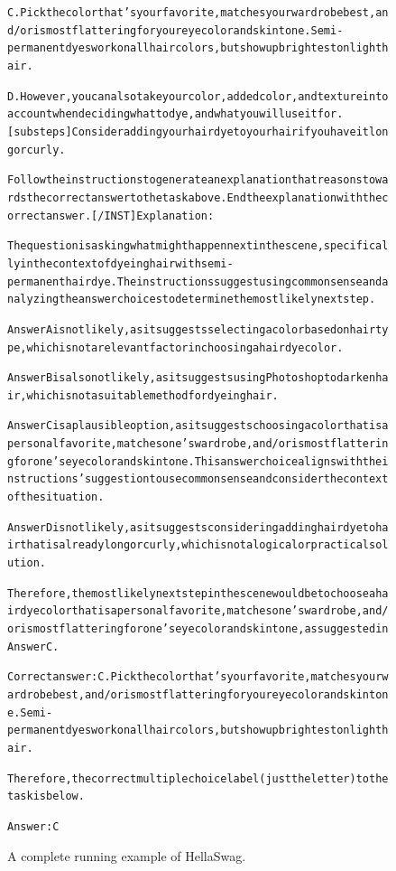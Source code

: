 \begin{figure}[t]
{{\begin{alltt}
C. Pick the color that's your favorite, matches your wardrobe best, and/or is most flattering for your eye color and skin tone. Semi-permanent dyes work on all hair colors, but show up brightest on light hair.

D. However, you can also take your color, added color, and texture into account when deciding what to dye, and what you will use it for. [substeps] Consider adding your hair dye to your hair if you have it long or curly.

Follow the instructions to generate an explanation that reasons towards the correct answer to the task above. End the explanation with the correct answer. [/INST] Explanation: 

The question is asking what might happen next in the scene, specifically in the context of dyeing hair with semi-permanent hair dye. The instructions suggest using commonsense and analyzing the answer choices to determine the most likely next step.

Answer A is not likely, as it suggests selecting a color based on hair type, which is not a relevant factor in choosing a hair dye color.

Answer B is also not likely, as it suggests using Photoshop to darken hair, which is not a suitable method for dyeing hair.

Answer C is a plausible option, as it suggests choosing a color that is a personal favorite, matches one's wardrobe, and/or is most flattering for one's eye color and skin tone. This answer choice aligns with the instructions' suggestion to use commonsense and consider the context of the situation.

Answer D is not likely, as it suggests considering adding hair dye to hair that is already long or curly, which is not a logical or practical solution.

Therefore, the most likely next step in the scene would be to choose a hair dye color that is a personal favorite, matches one's wardrobe, and/or is most flattering for one's eye color and skin tone, as suggested in Answer C.

Correct answer: C. Pick the color that's your favorite, matches your wardrobe best, and/or is most flattering for your eye color and skin tone. Semi-permanent dyes work on all hair colors, but show up brightest on light hair.

Therefore, the correct multiple choice label (just the letter) to the task is below.

Answer: C
\end{alltt}
}}
\caption{A complete running example of HellaSwag.}
\label{fig:commonsense_dataset=hellaswag_example}
\end{figure}
